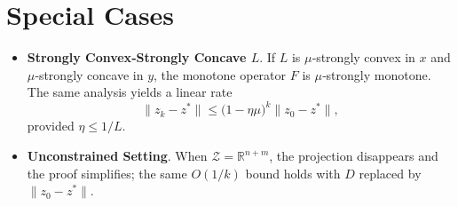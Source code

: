 \documentclass{article}
\newcommand{\R}{\mathbb{R}}
\begin{document}
\section*{Special Cases}
\begin{itemize}
\item \textbf{Strongly Convex‑Strongly Concave $L$}.  If $L$ is $\mu$‑strongly convex in $x$ and $\mu$‑strongly concave in $y$, the monotone operator $F$ is $\mu$‑strongly monotone.  The same analysis yields a linear rate
\[
\|z_{k}-z^{*}\|\le\bigl(1-\eta\mu\bigr)^{k}\|z_{0}-z^{*}\|,
\]
provided $\eta\le 1/L$.
\item \textbf{Unconstrained Setting}.  When $\mathcal Z=\R^{n+m}$, the projection disappears and the proof simplifies; the same $O(1/k)$ bound holds with $D$ replaced by $\|z_{0}-z^{*}\|$.
\end{itemize}
\end{document}
